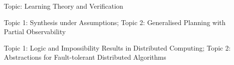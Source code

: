 \documentclass[11pt,a4paper,sans]{moderncv}
\begin{document}
{Topic: Learning Theory and Verification}{}{}{}

{Topic 1: Synthesis under Assumptions;
Topic 2: Generalised Planning with Partial Observability}{}{}{}

{Topic 1: Logic and Impossibility Results in Distributed Computing;
Topic 2: Abstractions for Fault-tolerant Distributed Algorithms}{}{}{}

% 
% 
% 
% 
% 
% 
% 
\end{document}
